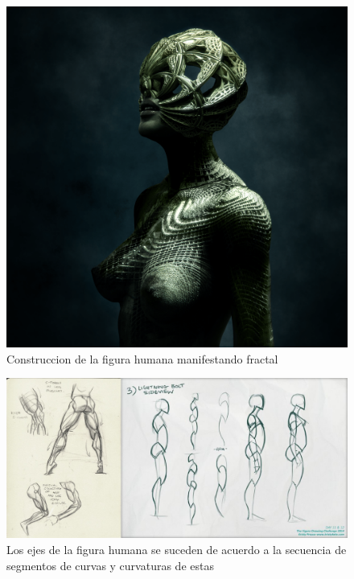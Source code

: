 \documentclass[
  11pt,
]{krantz}
\theoremstyle{definition}
\theoremstyle{definition}
\theoremstyle{definition}
\theoremstyle{definition}
\theoremstyle{remark}
\begin{document}
\begin{figure}[!ht]

{\centering \includegraphics[width=0.7\linewidth]{body1} 

}

\caption{Construccion de la figura humana manifestando fractal}\label{fig:body1}
\end{figure}

\begin{figure}[!ht]

{\centering \includegraphics[width=1\linewidth]{body} 

}

\caption{Los ejes de la figura humana se suceden de acuerdo a la secuencia de segmentos de curvas y curvaturas de estas}\label{fig:body}
\end{figure}
\end{document}
